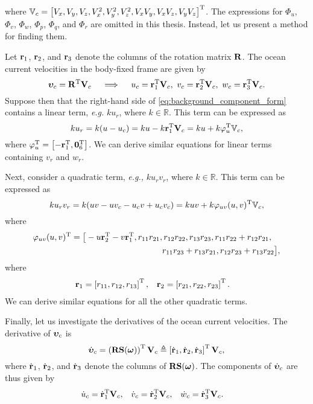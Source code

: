 \noindent where $\mathbb{V}_c = \left[V_x, V_y, V_z, V_x^2, V_y^2, V_z^2, V_xV_y, V_xV_z, V_yV_z\right]^{\mathrm{T}}$.
The expressions for $\Phi_u$, $\Phi_v$, $\Phi_w$, $\Phi_p$, $\Phi_q$, and $\Phi_r$ are omitted in this thesis.
Instead, let us present a method for finding them.

Let $\mathbf{r}_1$, $\mathbf{r}_2$, and $\mathbf{r}_3$ denote the columns of the rotation matrix $\mathbf{R}$.
The ocean current velocities in the body-fixed frame are given by
\begin{equation}
    \bm{\upsilon}_c = \mathbf{R}^{\mathrm{T}} \mathbf{V}_c \quad \implies \quad
    u_c = \mathbf{r}_1^{\mathrm{T}} \mathbf{V}_c, \,\,
    v_c = \mathbf{r}_2^{\mathrm{T}} \mathbf{V}_c, \,\,
    w_c = \mathbf{r}_3^{\mathrm{T}} \mathbf{V}_c.
\end{equation}
Suppose then that the right-hand side of \eqref{eq:background_component_form} contains a linear term, \emph{e.g.} $k u_r$, where $k \in \mathbb{R}$.
This term can be expressed as
\begin{equation}
    k u_r = k (u - u_c) = k u - k \mathbf{r}_1^{\mathrm{T}} \mathbf{V}_c
    = k u + k \varphi_u^{\mathrm{T}} \mathbb{V}_c,
\end{equation}
where $\varphi_u^{\mathrm{T}} = \left[-\mathbf{r}_1^{\mathrm{T}}, \mathbf{0}_6^{\mathrm{T}}\right]$.
We can derive similar equations for linear terms containing $v_r$ and $w_r$.

Next, consider a quadratic term, \emph{e.g.,} $k u_r v_r$, where $k \in \mathbb{R}$.
This term can be expressed as
\begin{equation}
    k u_r v_r = k (uv - uv_c - u_cv + u_cv_c) = k u v + k \varphi_{uv}(u,v)^{\mathrm{T}} \mathbb{V}_c,
\end{equation}
where
\begin{align}
    \varphi_{uv}(u,v)^{\mathrm{T}} = \big[-u\mathbf{r}_2^{\mathrm{T}}-v\mathbf{r}_1^{\mathrm{T}}, r_{11}r_{21}, &\,r_{12}r_{22}, r_{13}r_{23}, r_{11}r_{22}+r_{12}r_{21}, \\
    &r_{11}r_{23}+r_{13}r_{21}, r_{12}r_{23}+r_{13}r_{22}\big], \nonumber
\end{align}
where
\begin{align}
    \mathbf{r}_1 &= \left[r_{11}, r_{12}, r_{13}\right]^{\mathrm{T}}, &
    \mathbf{r}_2 &= \left[r_{21}, r_{22}, r_{23}\right]^{\mathrm{T}}.
\end{align}
We can derive similar equations for all the other quadratic terms.

Finally, let us investigate the derivatives of the ocean current velocities.
The derivative of $\bm{\upsilon}_c$ is
\begin{equation}
    \dot{\bm{\upsilon}}_c = \left(\mathbf{R}\mathbf{S}(\bm{\omega})\right)^{\mathrm{T}} \mathbf{V}_c \triangleq \left[\dot{\mathbf{r}}_1, \dot{\mathbf{r}}_2, \dot{\mathbf{r}}_3\right]^{\mathrm{T}} \mathbf{V}_c,
\end{equation}
where $\dot{\mathbf{r}}_1$, $\dot{\mathbf{r}}_2$, and $\dot{\mathbf{r}}_3$ denote the columns of $\mathbf{R}\mathbf{S}(\bm{\omega})$.
The components of $\dot{\bm{\upsilon}}_c$ are thus given by
\begin{align}
    \dot{u}_c &= \dot{\mathbf{r}}_1^{\mathrm{T}} \mathbf{V}_c, &
    \dot{v}_c &= \dot{\mathbf{r}}_2^{\mathrm{T}} \mathbf{V}_c, &
    \dot{w}_c &= \dot{\mathbf{r}}_3^{\mathrm{T}} \mathbf{V}_c.
\end{align}

